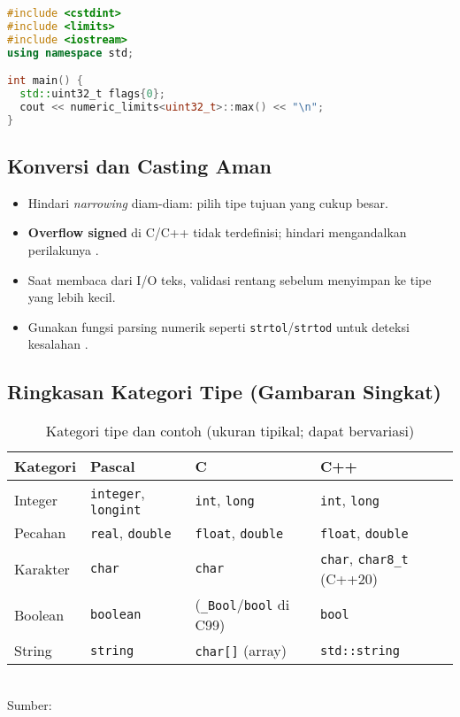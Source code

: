 \documentclass[../main.tex]{subfiles}
\begin{document}
\begin{lstlisting}[language=C++, caption={Contoh penggunaan <cstdint> di C++}]
#include <cstdint>
#include <limits>
#include <iostream>
using namespace std;

int main() {
  std::uint32_t flags{0};
  cout << numeric_limits<uint32_t>::max() << "\n";
}
\end{lstlisting}

\subsection{Konversi dan Casting Aman}
\begin{itemize}
  \item Hindari \textit{narrowing} diam-diam: pilih tipe tujuan yang cukup besar.
  \item \textbf{Overflow signed} di C/C++ tidak terdefinisi; hindari mengandalkan perilakunya \parencite{iso-c-draft-n1570,cpp-reference}.
  \item Saat membaca dari I/O teks, validasi rentang sebelum menyimpan ke tipe yang lebih kecil.
  \item Gunakan fungsi parsing numerik seperti \texttt{strtol}/\texttt{strtod} untuk deteksi kesalahan \parencite{c-strtol}.
\end{itemize}

\subsection{Ringkasan Kategori Tipe (Gambaran Singkat)}
\begin{table}[H]
  \centering
  \caption{Kategori tipe dan contoh (ukuran tipikal; dapat bervariasi)}
  \begin{tabular}{@{}llll@{}}
    \toprule
    Kategori & Pascal & C & C++ \\
    \midrule
    Integer & \texttt{integer}, \texttt{longint} & \texttt{int}, \texttt{long} & \texttt{int}, \texttt{long} \\
    Pecahan & \texttt{real}, \texttt{double} & \texttt{float}, \texttt{double} & \texttt{float}, \texttt{double} \\
    Karakter & \texttt{char} & \texttt{char} & \texttt{char}, \texttt{char8\_t} (C++20) \\
    Boolean & \texttt{boolean} & (\texttt{\_Bool}/\texttt{bool} di C99) & \texttt{bool} \\
    String & \texttt{string} & \texttt{char[]} (array) & \texttt{std::string} \\
    \bottomrule
  \end{tabular}
  \\Sumber: \parencite{free-pascal-docs,iso-c-draft-n1570,cpp-fundamental-types}
\end{table}
\end{document}
